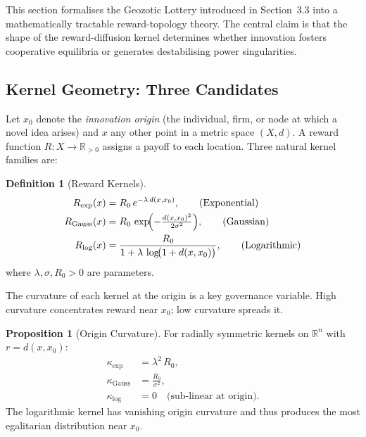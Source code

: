 \documentclass[12pt,a4paper]{article}
\theoremstyle{definition}
\newtheorem{definition}{Definition}[section]
\newtheorem{proposition}{Proposition}[section]
\begin{document}
This section formalises the Geozotic Lottery introduced in Section~3.3 into a
mathematically tractable reward-topology theory.  The central claim is that the
shape of the reward-diffusion kernel determines whether innovation fosters
cooperative equilibria or generates destabilising power singularities.

\subsection{Kernel Geometry: Three Candidates}

Let $x_0$ denote the \emph{innovation origin} (the individual, firm, or node at
which a novel idea arises) and $x$ any other point in a metric space
$(X, d)$.  A reward function $R : X \to \mathbb{R}_{>0}$ assigns a payoff to
each location.  Three natural kernel families are:

\begin{definition}[Reward Kernels]
  \label{def:kernels}
  \begin{align}
    R_{\exp}(x)  &= R_0\,e^{-\lambda\,d(x,x_0)},
      \tag{Exponential} \label{eq:Rexp}\\
    R_{\mathrm{Gauss}}(x) &= R_0\,\exp\!\Bigl(-\tfrac{d(x,x_0)^2}{2\sigma^2}\Bigr),
      \tag{Gaussian} \label{eq:RGauss}\\
    R_{\log}(x)  &= \frac{R_0}{1 + \lambda\,\log\!\bigl(1+d(x,x_0)\bigr)},
      \tag{Logarithmic} \label{eq:Rlog}
  \end{align}
  where $\lambda, \sigma, R_0 > 0$ are parameters.
\end{definition}

\medskip
\noindent The curvature of each kernel at the origin is a key governance
variable.  High curvature concentrates reward near $x_0$; low curvature
spreads it.

\begin{proposition}[Origin Curvature]
  \label{prop:curvature}
  For radially symmetric kernels on $\mathbb{R}^n$ with $r = d(x, x_0)$:
  \begin{align}
    \kappa_{\exp}   &= \lambda^2\,R_0, \\
    \kappa_{\mathrm{Gauss}} &= \frac{R_0}{\sigma^2}, \\
    \kappa_{\log}   &= 0 \quad \text{(sub-linear at origin).}
  \end{align}
  The logarithmic kernel has vanishing origin curvature and thus produces the
  most egalitarian distribution near $x_0$.
\end{proposition}
\end{document}
